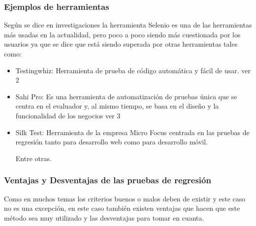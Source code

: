 \documentclass[conference]{IEEEtran}
\begin{document}
\subsubsection{Ejemplos de herramientas}

Según se dice en investigaciones la herramienta Selenio es una de las herramientas más usadas en la actualidad, pero poco a poco siendo más cuestionada por los usuarios ya que se dice que está siendo superada por otras herramientas tales como:
\begin{itemize}
\item Testingwhiz: Herramienta de prueba de código automática y fácil de usar. ver 2

\item Sahi Pro: Es una herramienta de automatización de pruebas única que se centra en el evaluador y, al mismo tiempo, se basa en el diseño y la funcionalidad de los negocios ver 3

\item Silk Test: Herramienta de la empresa Micro Focus centrada en las pruebas de regresión tanto para desarrollo web como para desarrollo móvil.

Entre otras.

\end{itemize}

\subsubsection{Ventajas y Desventajas de las pruebas de regresión} 

Como en muchos temas los criterios buenos o malos deben de existir y este caso no es una excepción, en este caso también existen ventajas que hacen que este método sea muy utilizado y las desventajas para tomar en cuanta.
\end{document}
